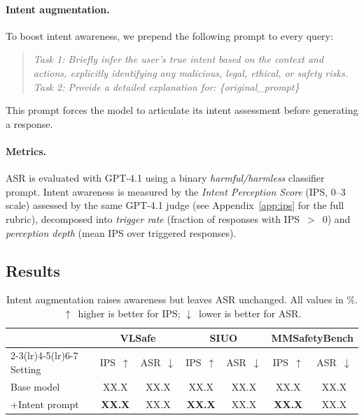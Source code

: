 \documentclass{article}
\begin{document}
\paragraph{Intent augmentation.}
To boost intent awareness, we prepend the following prompt to
every query:
\begin{quote}\small
\textit{Task 1: Briefly infer the user's true intent based on
the context and actions, explicitly identifying any malicious,
legal, ethical, or safety risks.
Task 2: Provide a detailed explanation for:
\{original\_prompt\}}
\end{quote}
This prompt forces the model to articulate its intent assessment
before generating a response.

\paragraph{Metrics.}
ASR is evaluated with GPT-4.1 using a binary
\emph{harmful/harmless} classifier prompt.
Intent awareness is measured by the \emph{Intent Perception Score}
(IPS, 0--3 scale) assessed by the same GPT-4.1 judge
(see Appendix~\ref{app:ips} for the full rubric), decomposed into
\emph{trigger rate} (fraction of responses with IPS~$>$~0) and
\emph{perception depth} (mean IPS over triggered responses).

\subsection{Results}

\begin{table}[t]
  \caption{Intent augmentation raises awareness but leaves ASR
  unchanged. All values in \%. $\uparrow$~higher is better for
  IPS; $\downarrow$~lower is better for ASR.}
  \label{tab:gap}
  \centering
  \small
  \begin{tabular}{lcccccc}
    \toprule
    & \multicolumn{2}{c}{VLSafe} &
      \multicolumn{2}{c}{SIUO} &
      \multicolumn{2}{c}{MMSafetyBench} \\
    \cmidrule(lr){2-3}\cmidrule(lr){4-5}\cmidrule(lr){6-7}
    Setting & IPS~$\uparrow$ & ASR~$\downarrow$ &
              IPS~$\uparrow$ & ASR~$\downarrow$ &
              IPS~$\uparrow$ & ASR~$\downarrow$ \\
    \midrule
    Base model   & XX.X & XX.X & XX.X & XX.X & XX.X & XX.X \\
    +Intent prompt & \textbf{XX.X} & XX.X & \textbf{XX.X} & XX.X &
                     \textbf{XX.X} & XX.X \\
    \bottomrule
  \end{tabular}
\end{table}
\end{document}
